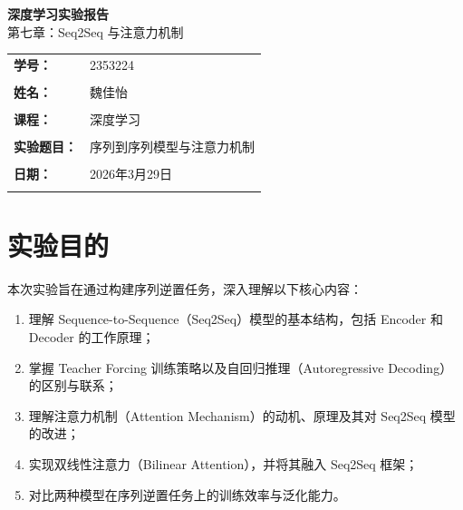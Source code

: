 \documentclass[12pt, a4paper]{article}
\begin{document}
\begin{titlepage}
    \centering
    \vspace*{3cm}
    {\Huge\bfseries 深度学习实验报告}\\
    \vspace{0.5cm}
    {\Large 第七章：Seq2Seq 与注意力机制}\\
    \vspace{2cm}
    \begin{tabular}{ll}
        \large\textbf{学号：} & \large 2353224 \\\\
        \large\textbf{姓名：} & \large 魏佳怡 \\\\
        \large\textbf{课程：} & \large 深度学习 \\\\
        \large\textbf{实验题目：} & \large 序列到序列模型与注意力机制 \\\\
        \large\textbf{日期：} & \large 2026年3月29日 \\\\
    \end{tabular}
    \vfill
\end{titlepage}

\onehalfspacing

\section{实验目的}

本次实验旨在通过构建序列逆置任务，深入理解以下核心内容：

\begin{enumerate}
    \item 理解 Sequence-to-Sequence（Seq2Seq）模型的基本结构，包括 Encoder 和 Decoder 的工作原理；
    \item 掌握 Teacher Forcing 训练策略以及自回归推理（Autoregressive Decoding）的区别与联系；
    \item 理解注意力机制（Attention Mechanism）的动机、原理及其对 Seq2Seq 模型的改进；
    \item 实现双线性注意力（Bilinear Attention），并将其融入 Seq2Seq 框架；
    \item 对比两种模型在序列逆置任务上的训练效率与泛化能力。
\end{enumerate}
\end{document}
